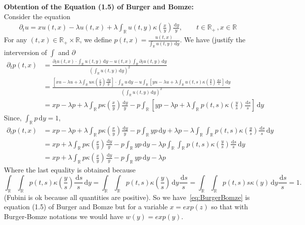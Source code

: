 \documentclass{article}
\newcommand{\p}{\partial}
\newcommand{\diff}{\,\mathrm{d}}
\newcommand{\RR}{\mathbb{R}}
\begin{document}
\noindent\textbf{Obtention of the Equation (1.5) of Burger and Bomze:} \\Consider the equation
\begin{align*}
    \p_t u = xu(t,x) - \lambda u(t,x)+ \lambda \int_\RR u(t,y)\kappa\left(\frac{x}{y}\right) \frac{\diff y}{y}, \qquad t \in \RR_+ \,, x \in \RR
\end{align*}
For any $(t, x) \in \RR_+ \times \RR$, we define $p(t,x) = \frac{u(t,x)}{\int_\RR u(t,y)\diff y}$. 
We have (justify the interversion of $\int$ and $\p$
\begin{align*}
    \p_t p(t, x) 
    &= \frac{\p_tu(t,x) \cdot \int_\RR u(t,y)\diff y - u(t,x) \int_\RR \p_t u(t,y)\diff y}{\left( \int_\RR u(t,y)\diff y \right)^2} \\
    &= \frac{\left[ xu - \lambda u + \lambda \int_\RR u\kappa\left(\frac{x}{y}\right) \frac{\diff y}{y}\right] \cdot \int_\RR u\diff y - u\int_\RR \left[ yu - \lambda u + \lambda \int_\RR u(t,s)\kappa\left(\frac{y}{s}\right) \frac{\diff s}{s}\right]\diff y}{\left( \int_\RR u(t,y)\diff y \right)^2} \\
    &= xp - \lambda p + \lambda \int_\RR p\kappa\left(\frac{x}{y}\right) \frac{\diff y}{y}
    -  p\int_\RR \left[ yp - \lambda p + \lambda \int_\RR p(t,s)\kappa\left(\frac{y}{s}\right) \frac{\diff s}{s}\right]\diff y
\end{align*}
Since, $\int_\RR p \diff y = 1$, 
\begin{equation}\label{eq:BurgerBomze}\begin{array}{ll}
    \p_t p(t, x) 
    &= xp - \lambda p + \lambda \int_\RR p\kappa\left(\frac{x}{y}\right) \frac{\diff y}{y}
    -  p\int_\RR yp \diff y + \lambda p - \lambda \int_\RR \int_\RR p(t,s)\kappa\left(\frac{y}{s}\right) \frac{\diff s}{s}\diff y\\
    &= xp 
    + \lambda \int_\RR p\kappa\left(\frac{x}{y}\right) \frac{\diff y}{y}
    - p\int_\RR yp \diff y 
    - \lambda p \int_\RR \int_\RR p(t,s)\kappa\left(\frac{y}{s}\right) \frac{\diff s}{s}\diff y\\
    &= xp 
    + \lambda \int_\RR p\kappa\left(\frac{x}{y}\right) \frac{\diff y}{y}
    - p\int_\RR yp \diff y 
    - \lambda p\end{array}
\end{equation}
Where the last equality is obtained because 
$$\int_\RR \int_\RR p(t,s)\kappa\left(\frac{y}{s}\right) \frac{\diff s}{s}\diff y = \int_\RR \int_\RR p(t,s)\kappa\left(\frac{y}{s}\right) \diff y \frac{\diff s}{s} = \int_\RR \int_\RR p(t,s)s\kappa\left(y\right) \diff y \frac{\diff s}{s} = 1.$$
(Fubini is ok because all quantities are positive). So we have~\eqref{eq:BurgerBomze}
is equation (1.5) of Burger and Bomze but for a variable $x=exp(z)$ so that with Burger-Bomze notations we would have $w(y)=exp(y)$.\\
\end{document}
